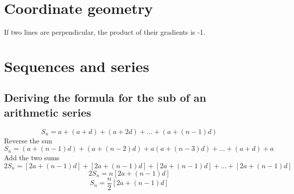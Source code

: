 \documentclass{article}[18pt]
\begin{document}
\section{Coordinate geometry}
If two lines are perpendicular, the product of their gradients is -1.
\section{Sequences and series}
\subsection{Deriving the formula for the sub of an arithmetic series}
$$S_n=a+(a+d)+(a+2d)+...+(a+(n-1)d)$$
Reverse the sun
$$S_n=(a+(n-1)d)+(a+(n-2)d)+a(a+(n-3)d)+...+(a+d)+a$$
Add the two sums
$$2S_n=[2a+(n-1)d]+[2a+(n-1)d]+[2a+(n-1)d]+...+[2a+(n-1)d]$$
$$2S_n=n[2a+(n-1)d]$$
$$S_n=\frac{n}{2}[2a+(n-1)d]$$
\end{document}
